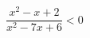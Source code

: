 \begin{ex}[type=inequality]
	\begin{condition}
		\( \dfrac{x^2-x+2}{x^2-7x+6}<0 \)
	\end{condition}
\end{ex}